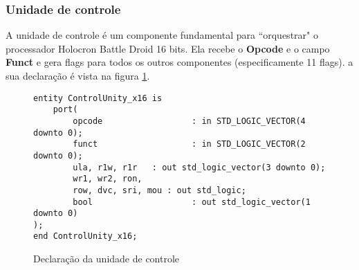 \documentclass{article}
\newcommand\tab[1][0.50cm]{\hspace*{#1}}
\begin{document}
			\subsubsection[Unidade de controle]{Unidade de controle}
				\tab A unidade de controle \'{e} um componente fundamental para ``orquestrar" o processador Holocron Battle Droid 16 bits. Ela recebe o \textbf{Opcode} e o campo \textbf{Funct} e gera flags para todos os outros componentes (especificamente 11 flags). a sua declara\c{c}\~{a}o \'{e} vista na figura \ref{fig:ControlUnity_x16}. 
				\begin{figure}[H]
					\centering
					\caption[Unidade de controle]{Declara\c{c}\~{a}o da unidade de controle}
					\label{fig:ControlUnity_x16}
					\begin{lstlisting}[style=vhdl]
entity ControlUnity_x16 is 
	port(
		opcode 					: in STD_LOGIC_VECTOR(4 downto 0);
		funct 					: in STD_LOGIC_VECTOR(2 downto 0);	
		ula, r1w, r1r 	: out std_logic_vector(3 downto 0);
		wr1, wr2, ron, 
		row, dvc, sri, mou : out std_logic;
		bool 					: out std_logic_vector(1 downto 0)
);
end ControlUnity_x16;
					\end{lstlisting}
				\end{figure}
\end{document}
